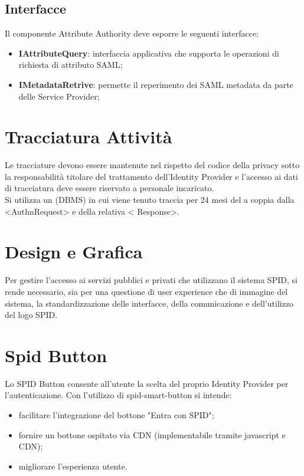 \subsection{Interfacce}
Il componente Attribute Authority deve esporre le seguenti interfacce:
\begin{itemize}
    \item \textbf{IAttributeQuery}: interfaccia applicativa che supporta le operazioni di richiesta di attributo SAML;
    \item \textbf{IMetadataRetrive}: permette il reperimento dei SAML metadata da parte delle Service Provider;
\end{itemize}

\section{Tracciatura Attività}
Le tracciature devono essere mantenute nel rispetto del codice della privacy sotto la responsabilità
titolare del trattamento dell’Identity Provider e l’accesso ai dati di tracciatura deve essere riservato
a personale incaricato.
\\ Si utilizza un (DBMS) in cui viene tenuto traccia per 24 mesi del
a coppia dalla <AuthnRequest> e della relativa < Response>.

\section{Design e Grafica}
Per gestire l’accesso ai servizi pubblici e privati che utilizzano 
il sistema SPID, si rende necessario, sia per una questione di 
user experience che di immagine del sistema, 
la standardizzazione delle interfacce, della comunicazione 
e dell’utilizzo del logo SPID.

\section{Spid Button}
Lo SPID Button consente all'utente la scelta del proprio Identity Provider per l'autenticazione.
Con l'utilizzo di spid-smart-button si intende:
\begin{itemize}
    \item facilitare l'integrazione del bottone "Entra con SPID";
    \item fornire un bottone ospitato via CDN (implementabile tramite javascript e CDN);
    \item migliorare l'esperienza utente.
\end{itemize}

